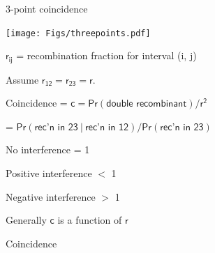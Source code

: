 \documentclass[aspectratio=169,12pt,t]{beamer}
\begin{document}
\begin{frame}[c]{3-point coincidence}

\hfill \texttt{[image: Figs/threepoints.pdf]}

\vspace*{-15mm}

  \bbi

\item $\mathsf{r_{ij}}$ = recombination fraction for interval (i, j)

{\hilit Assume $\mathsf{r_{12} = r_{23} = r}$.}

\item {\vhilit Coincidence} = $\mathsf{c = Pr(\text{double
  recombinant}) / r^2}$

\hspace{20mm} {\hilit = $\mathsf{Pr(\text{rec'n in 23} \ | \ \text{rec'n in 12}) /
  Pr(\text{rec'n in 23})}$}

\item
No interference { \hilit = 1 }

Positive interference { \hilit $<$ 1 }

Negative interference { \hilit $>$ 1  }


\item Generally {\hilit $\mathsf{c}$} is a function of {\hilit $\mathsf{r}$}

  \ei



\note{
}

\end{frame}



\begin{frame}[c]{Coincidence}

\note{
}

\end{frame}
\end{document}
